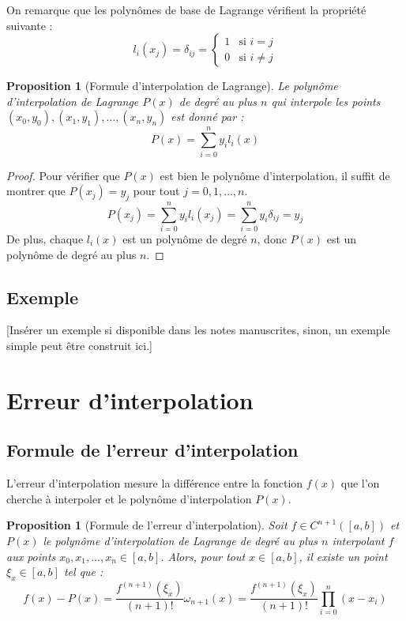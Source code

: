 \documentclass{article}
\newtheorem{proposition}[theorem]{Proposition}
\begin{document}
On remarque que les polynômes de base de Lagrange vérifient la propriété suivante :
\[
l_i(x_j) = \delta_{ij} = \begin{cases} 1 & \text{si } i = j \\ 0 & \text{si } i \neq j \end{cases}
\]

\begin{proposition}[Formule d'interpolation de Lagrange]
Le polynôme d'interpolation de Lagrange $P(x)$ de degré au plus $n$ qui interpole les points $(x_0, y_0), (x_1, y_1), \dots, (x_n, y_n)$ est donné par :
\[
P(x) = \sum_{i=0}^{n} y_i l_i(x)
\]
\end{proposition}

\begin{proof}
Pour vérifier que $P(x)$ est bien le polynôme d'interpolation, il suffit de montrer que $P(x_j) = y_j$ pour tout $j = 0, 1, \dots, n$.
\[
P(x_j) = \sum_{i=0}^{n} y_i l_i(x_j) = \sum_{i=0}^{n} y_i \delta_{ij} = y_j
\]
De plus, chaque $l_i(x)$ est un polynôme de degré $n$, donc $P(x)$ est un polynôme de degré au plus $n$.
\end{proof}

\subsection{Exemple}
[Insérer un exemple si disponible dans les notes manuscrites, sinon, un exemple simple peut être construit ici.]

\section{Erreur d'interpolation}

\subsection{Formule de l'erreur d'interpolation}

L'erreur d'interpolation mesure la différence entre la fonction $f(x)$ que l'on cherche à interpoler et le polynôme d'interpolation $P(x)$.

\begin{proposition}[Formule de l'erreur d'interpolation]
Soit $f \in C^{n+1}([a, b])$ et $P(x)$ le polynôme d'interpolation de Lagrange de degré au plus $n$ interpolant $f$ aux points $x_0, x_1, \dots, x_n \in [a, b]$. Alors, pour tout $x \in [a, b]$, il existe un point $\xi_x \in [a, b]$ tel que :
\[
f(x) - P(x) = \frac{f^{(n+1)}(\xi_x)}{(n+1)!} \omega_{n+1}(x) = \frac{f^{(n+1)}(\xi_x)}{(n+1)!} \prod_{i=0}^{n} (x - x_i)
\]
\end{proposition}
\end{document}
